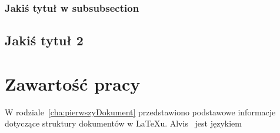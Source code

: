 \subsubsection{Jakiś tytuł w subsubsection}


\subsection{Jakiś tytuł 2}


\section{Zawartość pracy}
\label{sec:zawartoscPracy}

W rodziale~\ref{cha:pierwszyDokument} przedstawiono podstawowe informacje dotyczące struktury dokumentów w \LaTeX u. Alvis~\cite{Alvis2011} jest językiem 













